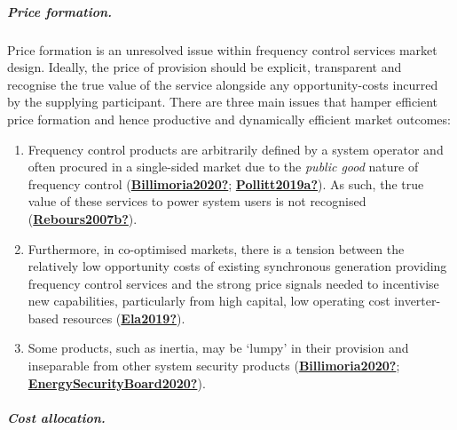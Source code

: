 \documentclass[12pt,a4paper,]{report}
\begin{document}
\hypertarget{price-formation.}{%
\subparagraph{Price formation.}\label{price-formation.}}

Price formation is an unresolved issue within frequency control services
market design. Ideally, the price of provision should be explicit,
transparent and recognise the true value of the service alongside any
opportunity-costs incurred by the supplying participant. There are three
main issues that hamper efficient price formation and hence productive
and dynamically efficient market outcomes:

\begin{enumerate}
\def\labelenumi{\arabic{enumi}.}
\item
  Frequency control products are arbitrarily defined by a system
  operator and often procured in a single-sided market due to the
  \emph{public good} nature of frequency control
  (\protect\hyperlink{ref-Billimoria2020}{\textbf{Billimoria2020?}};
  \protect\hyperlink{ref-Pollitt2019a}{\textbf{Pollitt2019a?}}). As
  such, the true value of these services to power system users is not
  recognised
  (\protect\hyperlink{ref-Rebours2007b}{\textbf{Rebours2007b?}}).
\item
  Furthermore, in co-optimised markets, there is a tension between the
  relatively low opportunity costs of existing synchronous generation
  providing frequency control services and the strong price signals
  needed to incentivise new capabilities, particularly from high
  capital, low operating cost inverter-based resources
  (\protect\hyperlink{ref-Ela2019}{\textbf{Ela2019?}}).
\item
  Some products, such as inertia, may be `lumpy' in their provision and
  inseparable from other system security products
  (\protect\hyperlink{ref-Billimoria2020}{\textbf{Billimoria2020?}};
  \protect\hyperlink{ref-EnergySecurityBoard2020}{\textbf{EnergySecurityBoard2020?}}).
\end{enumerate}

\hypertarget{cost-allocation.}{%
\subparagraph{Cost allocation.}\label{cost-allocation.}}
\end{document}
